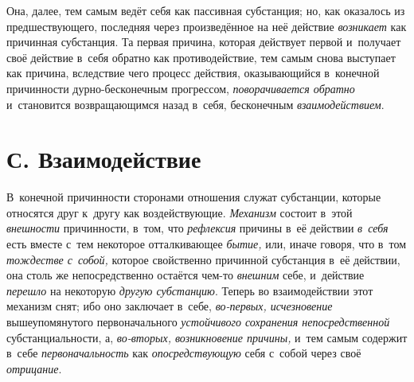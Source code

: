 Она, далее, тем самым ведёт себя как пассивная субстанция; но, как оказалось
из предшествующего, последняя через произведённое на неё действие
{\em возникает} как причинная субстанция. Та первая
причина, которая действует первой и~получает своё действие в~себя обратно
как противодействие, тем самым снова выступает как причина, вследствие чего
процесс действия, оказывающийся в~конечной причинности дурно-бесконечным
прогрессом, {\em поворачивается обратно} и~становится
возвращающимся назад в~себя, бесконечным {\em взаимодействием}.


\section[С. Взаимодействие]{С. Взаимодействие}

В~конечной причинности сторонами отношения
служат субстанции, которые относятся друг к~другу как воздействующие.
{\em Механизм} состоит в~этой {\em внешности} причинности, в~том, что
{\em рефлексия} причины в~её действии
{\em в~себя} есть вместе с~тем некоторое отталкивающее
{\em бытие,} или, иначе говоря, что в~том
{\em тождестве с~собой,} которое свойственно причинной
субстанция в~её действии, она столь же непосредственно остаётся чем-то
{\em внешним} себе, и~действие {\em перешло} на некоторую
{\em другую субстанцию}. Теперь во взаимодействии этот
механизм снят; ибо оно заключает в~себе, {\em во-первых, исчезновение}
вышеупомянутого первоначального {\em устойчивого
сохранения непосредственной} субстанциальности, а,
{\em во-вторых, возникновение причины,} и~тем самым содержит в~себе
{\em первоначальность} как {\em опосредствующую} себя с~собой через своё
{\em отрицание}.

